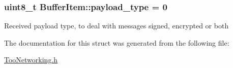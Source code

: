 \subsubsection[{\texorpdfstring{payload\+\_\+type}{payload_type}}]{\setlength{\rightskip}{0pt plus 5cm}uint8\+\_\+t Buffer\+Item\+::payload\+\_\+type = 0}\hypertarget{structBufferItem_a3d7529f54e1e8ffaa3ee3b85ae0ebbbd}{}\label{structBufferItem_a3d7529f54e1e8ffaa3ee3b85ae0ebbbd}
Received payload type, to deal with messages signed, encrypted or both 

The documentation for this struct was generated from the following file\+:\begin{DoxyCompactItemize}
\item 
\hyperlink{TooNetworking_8h}{Too\+Networking.\+h}\end{DoxyCompactItemize}
